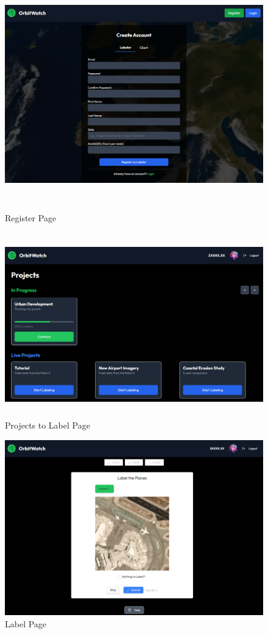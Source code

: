 \documentclass[12pt, titlepage]{article}
\begin{document}
\begin{figure}[H]
    \centering
    \includegraphics[width=\linewidth, height=10cm]{register.png}
    \caption{Register Page}
\end{figure}
\begin{figure}[H]
    \centering
    \includegraphics[width=\linewidth, height=8cm]{label_projects.png}
    \caption{Projects to Label Page}
\end{figure}
\begin{figure}[H]
    \centering
    \includegraphics[scale=0.4]{label.png}
    \caption{Label Page}
\end{figure}
\end{document}

